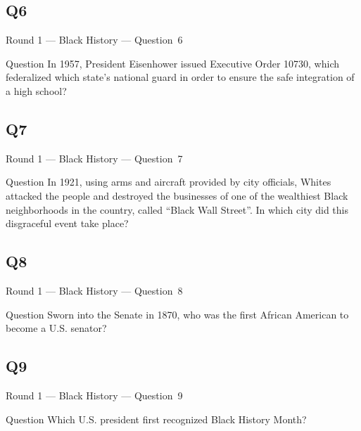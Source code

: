 \documentclass[11pt]{beamer}
\begin{document}
\subsection*{Q6}
\begin{frame}[t]{Round 1 --- Black History --- \mbox{Question 6}}
\vspace{-0.5em}
\begin{block}{Question}
In 1957, President Eisenhower issued Executive Order 10730, which federalized which state's national guard in order to ensure the safe integration of a high school?
\end{block}
\end{frame}
\subsection*{Q7}
\begin{frame}[t]{Round 1 --- Black History --- \mbox{Question 7}}
\vspace{-0.5em}
\begin{block}{Question}
In 1921, using arms and aircraft provided by city officials, Whites attacked the people and destroyed the businesses of one of the wealthiest Black neighborhoods in the country, called ``Black Wall Street''. In which city did this disgraceful event take place?
\end{block}
\end{frame}
\subsection*{Q8}
\begin{frame}[t]{Round 1 --- Black History --- \mbox{Question 8}}
\vspace{-0.5em}
\begin{block}{Question}
Sworn into the Senate in 1870, who was the first African American to become a U.S. senator?
\end{block}
\end{frame}
\subsection*{Q9}
\begin{frame}[t]{Round 1 --- Black History --- \mbox{Question 9}}
\vspace{-0.5em}
\begin{block}{Question}
Which U.S. president first recognized Black History Month?
\end{block}
\end{frame}
\end{document}
